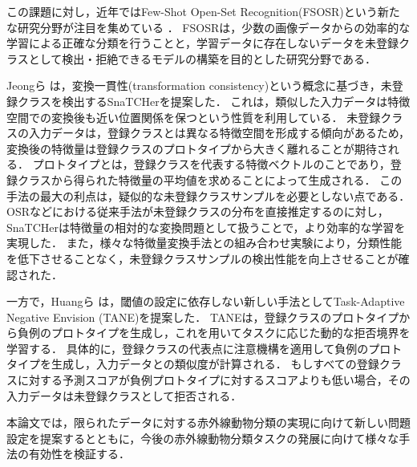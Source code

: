 \documentclass[a4paper,11pt,nomag]{jsreport}
\begin{document}
この課題に対し，近年ではFew-Shot Open-Set Recognition(FSOSR)という新たな研究分野が注目を集めている \cite{peeler, che2023}．
FSOSRは，少数の画像データからの効率的な学習による正確な分類を行うことと，学習データに存在しないデータを未登録クラスとして検出・拒絶できるモデルの構築を目的とした研究分野である．

Jeongら \cite{snatcher}は，変換一貫性(transformation consistency)という概念に基づき，未登録クラスを検出するSnaTCHerを提案した．
これは，類似した入力データは特徴空間での変換後も近い位置関係を保つという性質を利用している．
未登録クラスの入力データは，登録クラスとは異なる特徴空間を形成する傾向があるため，変換後の特徴量は登録クラスのプロトタイプから大きく離れることが期待される．
プロトタイプとは，登録クラスを代表する特徴ベクトルのことであり，登録クラスから得られた特徴量の平均値を求めることによって生成される．
この手法の最大の利点は，疑似的な未登録クラスサンプルを必要としない点である．
OSRなどにおける従来手法が未登録クラスの分布を直接推定するのに対し，SnaTCHerは特徴量の相対的な変換問題として扱うことで，より効率的な学習を実現した．
また，様々な特徴量変換手法との組み合わせ実験により，分類性能を低下させることなく，未登録クラスサンプルの検出性能を向上させることが確認された．

一方で，Huangら \cite{tane}は，閾値の設定に依存しない新しい手法としてTask-Adaptive Negative Envision (TANE)を提案した．
TANEは，登録クラスのプロトタイプから負例のプロトタイプを生成し，これを用いてタスクに応じた動的な拒否境界を学習する．
具体的に，登録クラスの代表点に注意機構を適用して負例のプロトタイプを生成し，入力データとの類似度が計算される．
もしすべての登録クラスに対する予測スコアが負例プロトタイプに対するスコアよりも低い場合，その入力データは未登録クラスとして拒否される．

本論文では，限られたデータに対する赤外線動物分類の実現に向けて新しい問題設定を提案するとともに，今後の赤外線動物分類タスクの発展に向けて様々な手法の有効性を検証する．



\end{document}
